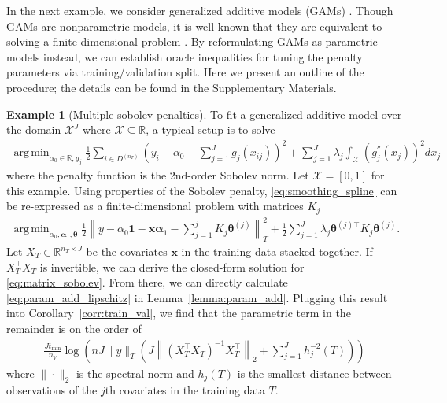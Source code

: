 \documentclass[12pt]{article} %
\theoremstyle{definition}
\newtheorem{example}{Example}
\DeclareMathOperator*{\argmin}{arg\,min}
\begin{document}
In the next example, we consider generalized additive models (GAMs) \citep{hastie1990generalized}.
Though GAMs are nonparametric models, it is well-known that they are equivalent to solving a finite-dimensional problem \citep{green1993nonparametric, o1986automatic, buja1989linear}.
By reformulating GAMs as parametric models instead, we can establish oracle inequalities for tuning the penalty parameters via training/validation split.
Here we present an outline of the procedure; the details can be found in the Supplementary Materials.
\begin{example}[Multiple sobolev penalties]
	\label{example:sobolev}
	To fit a generalized additive model over the domain $\mathcal{X}^J$ where $\mathcal{X} \subseteq \mathbb{R}$, a typical setup is to solve
	\begin{align}
	\argmin_{\alpha_0 \in \mathbb{R}, g_j}
	\frac{1}{2} \sum_{i\in D^{(n_T)}}
	\left(
	y_i - \alpha_0 - \sum_{j=1}^J g_j(x_{ij})
	\right)^2
	+ \sum_{j=1}^{J} \lambda_j \int_{\mathcal{X}} \left(g_j^{''}(x_j)\right)^{2} dx_j
	\label{eq:smoothing_spline}
	\end{align}
	where the penalty function is the 2nd-order Sobolev norm.
	Let $\mathcal{X} = [0,1]$ for this example.
	Using properties of the Sobolev penalty, \eqref{eq:smoothing_spline} can be re-expressed as a finite-dimensional problem with matrices $K_j$
	\begin{align}
	\argmin_{\alpha_0, \boldsymbol{\alpha}_1, \boldsymbol{\theta}}
	\frac{1}{2}
	\left \|
	y -
	\alpha_0 \boldsymbol{1}
	- \boldsymbol{x} \boldsymbol{\alpha}_1
	- \sum_{j=1}^j K_j \boldsymbol{\theta}^{(j)}
	\right \|^2_T
	+
	\frac{1}{2}
	\sum_{j = 1}^J
	\lambda_j \boldsymbol{\theta}^{(j)\top} K_j \boldsymbol{\theta}^{(j)}.
	\label{eq:matrix_sobolev}
	\end{align}
	Let $X_T \in \mathbb{R}^{n_T\times J}$ be the covariates $\boldsymbol{x}$ in the training data stacked together.
	If $X_T^\top X_T$ is invertible, we can derive the closed-form solution for \eqref{eq:matrix_sobolev}.
	From there, we can directly calculate \eqref{eq:param_add_lipschitz} in Lemma~\ref{lemma:param_add}.
	Plugging this result into Corollary~\ref{corr:train_val}, we find that the parametric term in the remainder is on the order of
	\begin{align}
	\frac{J t_{\min}}{n_{V}} \log \left (
	n
	J
	\|y\|_T
	\left(
	J
	\left \|
	\left(
	X_T^\top X_T
	\right)^{-1}
	X_T^\top
	\right \|_2
	+
	\sum_{j=1}^J h_j^{-2}(T)
	\right)
	\right )
	\label{eq:sobolev_param}
	\end{align}
	where $\|\cdot\|_2$ is the spectral norm and $h_j(T)$ is the smallest distance between observations of the $j$th covariates in the training data $T$.


\end{example}
\end{document}
